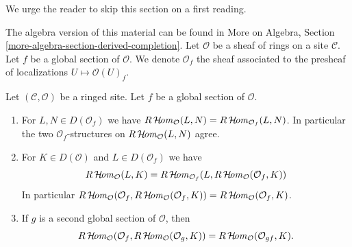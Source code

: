 \noindent
We urge the reader to skip this section on a first reading.

\medskip\noindent
The algebra version of this material can be found in
More on Algebra, Section \ref{more-algebra-section-derived-completion}.
Let $\mathcal{O}$ be a sheaf of rings on a site $\mathcal{C}$.
Let $f$ be a global section of $\mathcal{O}$. We denote
$\mathcal{O}_f$ the sheaf associated to the presheaf of localizations
$U \mapsto \mathcal{O}(U)_f$.

\begin{lemma}
\label{lemma-map-twice-localize}
Let $(\mathcal{C}, \mathcal{O})$ be a ringed site. Let $f$ be a global
section of $\mathcal{O}$.
\begin{enumerate}
\item For $L, N \in D(\mathcal{O}_f)$ we have
$R\mathop{\mathcal{H}\!\mathit{om}}\nolimits_\mathcal{O}(L, N) = R\mathop{\mathcal{H}\!\mathit{om}}\nolimits_{\mathcal{O}_f}(L, N)$.
In particular the two $\mathcal{O}_f$-structures on
$R\mathop{\mathcal{H}\!\mathit{om}}\nolimits_\mathcal{O}(L, N)$ agree.
\item For $K \in D(\mathcal{O})$ and
$L \in D(\mathcal{O}_f)$ we have
$$
R\mathop{\mathcal{H}\!\mathit{om}}\nolimits_\mathcal{O}(L, K) =
R\mathop{\mathcal{H}\!\mathit{om}}\nolimits_{\mathcal{O}_f}(L, R\mathop{\mathcal{H}\!\mathit{om}}\nolimits_\mathcal{O}(\mathcal{O}_f, K))
$$
In particular
$R\mathop{\mathcal{H}\!\mathit{om}}\nolimits_\mathcal{O}(\mathcal{O}_f,
R\mathop{\mathcal{H}\!\mathit{om}}\nolimits_\mathcal{O}(\mathcal{O}_f, K)) =
R\mathop{\mathcal{H}\!\mathit{om}}\nolimits_\mathcal{O}(\mathcal{O}_f, K)$.
\item If $g$ is a second global
section of $\mathcal{O}$, then
$$
R\mathop{\mathcal{H}\!\mathit{om}}\nolimits_\mathcal{O}(\mathcal{O}_f, R\mathop{\mathcal{H}\!\mathit{om}}\nolimits_\mathcal{O}(\mathcal{O}_g, K))
= R\mathop{\mathcal{H}\!\mathit{om}}\nolimits_\mathcal{O}(\mathcal{O}_{gf}, K).
$$
\end{enumerate}
\end{lemma}

